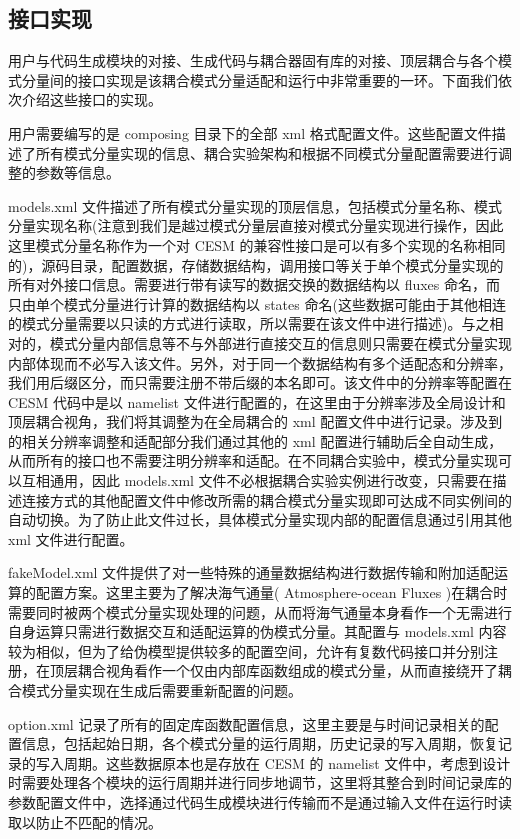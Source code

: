 \subsection{接口实现}

用户与代码生成模块的对接、生成代码与耦合器固有库的对接、顶层耦合与各个模式分量间的接口实现是该耦合模式分量适配和运行中非常重要的一环。下面我们依次介绍这些接口的实现。

用户需要编写的是 composing 目录下的全部 xml 格式配置文件。这些配置文件描述了所有模式分量实现的信息、耦合实验架构和根据不同模式分量配置需要进行调整的参数等信息。

models.xml 文件描述了所有模式分量实现的顶层信息，包括模式分量名称、模式分量实现名称(注意到我们是越过模式分量层直接对模式分量实现进行操作，因此这里模式分量名称作为一个对 CESM 的兼容性接口是可以有多个实现的名称相同的)，源码目录，配置数据，存储数据结构，调用接口等关于单个模式分量实现的所有对外接口信息。需要进行带有读写的数据交换的数据结构以 fluxes 命名，而只由单个模式分量进行计算的数据结构以 states 命名(这些数据可能由于其他相连的模式分量需要以只读的方式进行读取，所以需要在该文件中进行描述)。与之相对的，模式分量内部信息等不与外部进行直接交互的信息则只需要在模式分量实现内部体现而不必写入该文件。另外，对于同一个数据结构有多个适配态和分辨率，我们用后缀区分，而只需要注册不带后缀的本名即可。该文件中的分辨率等配置在 CESM 代码中是以 namelist 文件进行配置的，在这里由于分辨率涉及全局设计和顶层耦合视角，我们将其调整为在全局耦合的 xml 配置文件中进行记录。涉及到的相关分辨率调整和适配部分我们通过其他的 xml 配置进行辅助后全自动生成，从而所有的接口也不需要注明分辨率和适配。在不同耦合实验中，模式分量实现可以互相通用，因此 models.xml 文件不必根据耦合实验实例进行改变，只需要在描述连接方式的其他配置文件中修改所需的耦合模式分量实现即可达成不同实例间的自动切换。为了防止此文件过长，具体模式分量实现内部的配置信息通过引用其他 xml 文件进行配置。

fakeModel.xml 文件提供了对一些特殊的通量数据结构进行数据传输和附加适配运算的配置方案。这里主要为了解决海气通量( Atmosphere-ocean Fluxes )在耦合时需要同时被两个模式分量实现处理的问题，从而将海气通量本身看作一个无需进行自身运算只需进行数据交互和适配运算的伪模式分量。其配置与 models.xml 内容较为相似，但为了给伪模型提供较多的配置空间，允许有复数代码接口并分别注册，在顶层耦合视角看作一个仅由内部库函数组成的模式分量，从而直接绕开了耦合模式分量实现在生成后需要重新配置的问题。

option.xml 记录了所有的固定库函数配置信息，这里主要是与时间记录相关的配置信息，包括起始日期，各个模式分量的运行周期，历史记录的写入周期，恢复记录的写入周期。这些数据原本也是存放在 CESM 的 namelist 文件中，考虑到设计时需要处理各个模块的运行周期并进行同步地调节，这里将其整合到时间记录库的参数配置文件中，选择通过代码生成模块进行传输而不是通过输入文件在运行时读取以防止不匹配的情况。

